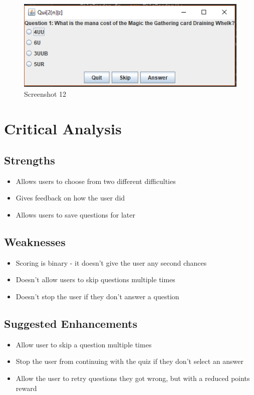 \documentclass{report}
\begin{document}
    \begin{figure}
    	\centering
    	\includegraphics{Screenshot12}
    	\caption{Screenshot 12}
    	\label{fig:screenshot12}
    \end{figure}
    
    \chapter{Critical Analysis}
        \section{Strengths}
        \begin{itemize}
            \item Allows users to choose from two different difficulties
            \item Gives feedback on how the user did
            \item Allows users to save questions for later
        \end{itemize}
        
        \section{Weaknesses}
        \begin{itemize}
            \item Scoring is binary - it doesn't give the user any second chances
            \item Doesn't allow users to skip questions multiple times
            \item Doesn't stop the user if they don't answer a question
        \end{itemize}
        
        \section{Suggested Enhancements}
        \begin{itemize}
        	\item Allow user to skip a question multiple times
        	\item Stop the user from continuing with the quiz if they don't select an answer
        	\item Allow the user to retry questions they got wrong, but with a reduced points reward
        \end{itemize}
        
\end{document}
